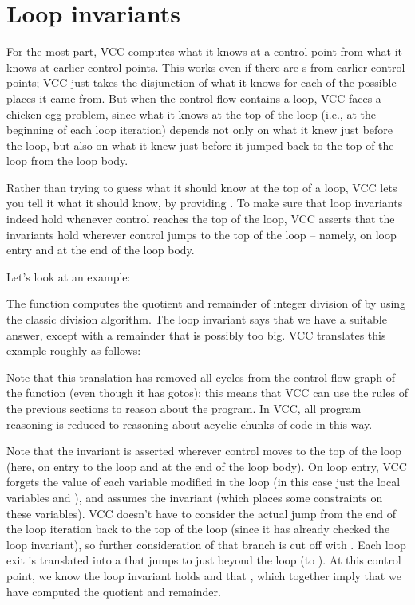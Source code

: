 \section{Loop invariants}

For the most part, VCC computes what it knows at a control point from
what it knows at earlier control points. This works even if there are
s from earlier control points; VCC just takes the disjunction of 
what it knows for each of the possible places it came from. 
But when the control flow contains a loop, VCC faces a
chicken-egg problem, since what it knows at the top of the loop (i.e.,
at the beginning of each loop iteration) depends not only on what it
knew just before the loop, but also on what it knew just before it
jumped back to the top of the loop from the loop body.

Rather than trying to guess what it should know at the top of a loop,
VCC lets you tell it what it should know, by providing . To make sure that loop invariants indeed hold 
whenever control reaches the top
of the loop, VCC asserts that the invariants hold wherever control
jumps to the top of the loop -- namely, on loop entry and at the end of
the loop body.

Let's look at an example:
\noindent

The  function computes the quotient and remainder of
integer division of  by  using the classic division
algorithm.  The loop invariant says that we have a suitable answer,
except with a remainder that is possibly too big. VCC translates this
example roughly as follows:

\noindent
Note that this translation has removed all cycles from the control
flow graph of the function (even though it has gotos); this means that
VCC can use the rules of the previous sections to reason about the
program. In VCC, all program reasoning is reduced to reasoning about
acyclic chunks of code in this way.

Note that the invariant is asserted wherever control moves to the top of the
loop (here, on entry to the loop and at the end of the loop body). On
loop entry, VCC forgets the value of each variable modified in the
loop (in this case just the local variables  and ),
and assumes the invariant (which places some constraints on these
variables).  VCC doesn't have to consider the actual jump from the end
of the loop iteration back to the top of the loop (since it has
already checked the loop invariant), so further consideration of that
branch is cut off with .  Each loop exit is
translated into a  that jumps to just beyond the loop (to
). At this control point, we know the loop invariant
holds and that , which together imply that we have
computed the quotient and remainder.


